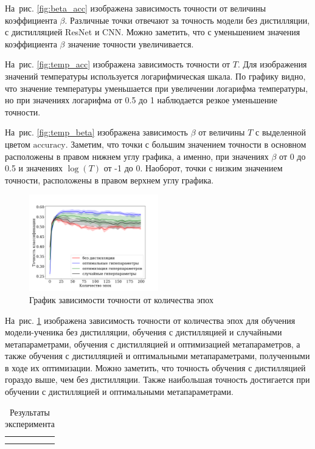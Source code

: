 \documentclass[12pt, twoside]{article}
\begin{document}
На~рис. \ref{fig:beta_acc} изображена зависимость точности от величины коэффициента $\beta$. Различные точки отвечают за точность модели без дистилляции, с дистилляцией ResNet и CNN. Можно заметить, что с уменьшением значения коэффициента $\beta$ значение точности увеличивается.

На~рис. \ref{fig:temp_acc} изображена зависимость точности от $T$. Для изображения значений температуры используется логарифмическая шкала. По графику видно, что значение температуры уменьшается при увеличении логарифма температуры, но при значениях логарифма от 0.5 до 1 наблюдается резкое уменьшение точности.

На~рис. \ref{fig:temp_beta} изображена зависимость $\beta$ от величины $T$ с выделенной цветом $\text{accuracy}$. Заметим, что точки с большим значением точности в основном расположены в правом нижнем углу графика, а именно, при значениях $\beta$ от 0 до 0.5 и значениях $\log(T)$ от -1 до 0. Наоборот, точки с низким значением точности, расположены в правом верхнем углу графика.

\begin{figure}[!ht]
    \centering
    \includegraphics[width=0.5\textwidth]{slides/acc.pdf}
    \caption{График зависимости точности от количества эпох}
    \label{fig:acc_epoch}
\end{figure}

На~рис. \ref{fig:acc_epoch} изображена зависимость точности от количества эпох для обучения модели-ученика без дистилляции, обучения с дистилляцией и случайными метапараметрами, обучения с дистилляцией и оптимизацией метапараметров, а также обучения с дистилляцией и оптимальными метапараметрами, полученными в ходе их оптимизации. Можно заметить, что точность обучения с дистилляцией гораздо выше, чем без дистилляции. Также наибольшая точность достигается при обучении с дистилляцией и оптимальными метапараметрами.

\begin{table}[h]
    \centering
    \begin{tabular}{c|c}
         &  \\
         & 
    \end{tabular}
    \caption{Результаты эксперимента}
    \label{tab:experiment_results}
\end{table}
\end{document}
